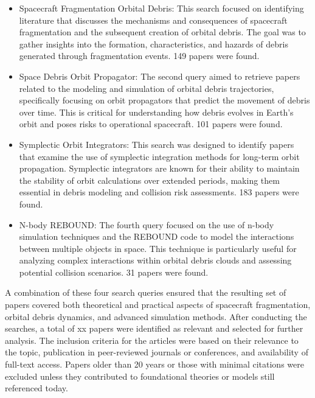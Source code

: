 \documentclass[journal ]{new-aiaa}
\begin{document}
\begin{itemize}
    \item Spacecraft Fragmentation Orbital Debris: This search focused on identifying literature that discusses the mechanisms and consequences of spacecraft fragmentation and the subsequent creation of orbital debris. The goal was to gather insights into the formation, characteristics, and hazards of debris generated through fragmentation events. 149 papers were found.
    \item Space Debris Orbit Propagator: The second query aimed to retrieve papers related to the modeling and simulation of orbital debris trajectories, specifically focusing on orbit propagators that predict the movement of debris over time. This is critical for understanding how debris evolves in Earth’s orbit and poses risks to operational spacecraft. 101 papers were found.
    \item Symplectic Orbit Integrators: This search was designed to identify papers that examine the use of symplectic integration methods for long-term orbit propagation. Symplectic integrators are known for their ability to maintain the stability of orbit calculations over extended periods, making them essential in debris modeling and collision risk assessments. 183 papers were found.
    \item N-body REBOUND: The fourth query focused on the use of n-body simulation techniques and the REBOUND code to model the interactions between multiple objects in space. This technique is particularly useful for analyzing complex interactions within orbital debris clouds and assessing potential collision scenarios. 31 papers were found.
\end{itemize}

A combination of these four search queries ensured that the resulting set of papers covered both theoretical and practical aspects of spacecraft fragmentation, orbital debris dynamics, and advanced simulation methods. After conducting the searches, a total of xx papers were identified as relevant and selected for further analysis. The inclusion criteria for the articles were based on their relevance to the topic, publication in peer-reviewed journals or conferences, and availability of full-text access. Papers older than 20 years or those with minimal citations were excluded unless they contributed to foundational theories or models still referenced today.
\end{document}
